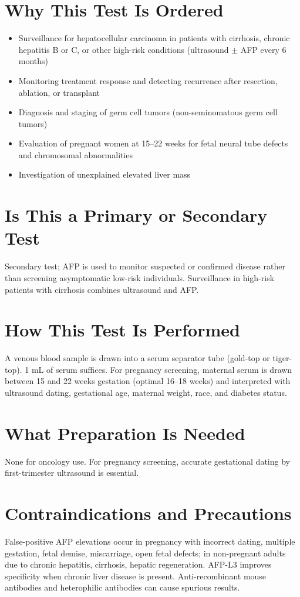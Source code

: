 \section*{Why This Test Is Ordered}
\begin{itemize}
  \item Surveillance for hepatocellular carcinoma in patients with cirrhosis, chronic hepatitis B or C, or other high-risk conditions (ultrasound $\pm$ AFP every 6 months)
  \item Monitoring treatment response and detecting recurrence after resection, ablation, or transplant
  \item Diagnosis and staging of germ cell tumors (non-seminomatous germ cell tumors)
  \item Evaluation of pregnant women at 15--22 weeks for fetal neural tube defects and chromosomal abnormalities
  \item Investigation of unexplained elevated liver mass
\end{itemize}

\section*{Is This a Primary or Secondary Test}
Secondary test; AFP is used to monitor suspected or confirmed disease rather than screening asymptomatic low-risk individuals. Surveillance in high-risk patients with cirrhosis combines ultrasound and AFP.

\section*{How This Test Is Performed}
A venous blood sample is drawn into a serum separator tube (gold-top or tiger-top). 1 mL of serum suffices. For pregnancy screening, maternal serum is drawn between 15 and 22 weeks gestation (optimal 16--18 weeks) and interpreted with ultrasound dating, gestational age, maternal weight, race, and diabetes status.

\section*{What Preparation Is Needed}
None for oncology use. For pregnancy screening, accurate gestational dating by first-trimester ultrasound is essential.

\section*{Contraindications and Precautions}
False-positive AFP elevations occur in pregnancy with incorrect dating, multiple gestation, fetal demise, miscarriage, open fetal defects; in non-pregnant adults due to chronic hepatitis, cirrhosis, hepatic regeneration. AFP-L3 improves specificity when chronic liver disease is present. Anti-recombinant mouse antibodies and heterophilic antibodies can cause spurious results.

